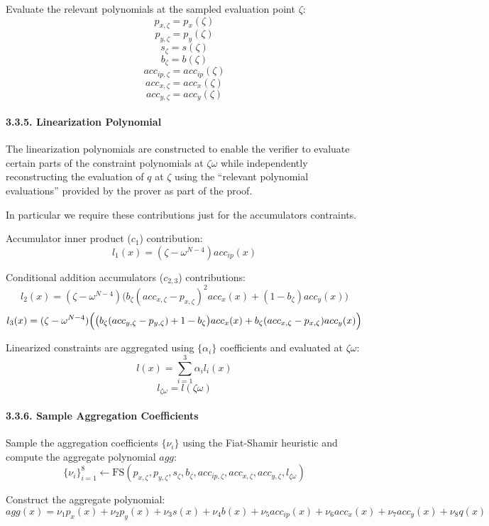 \documentclass[
]{article}
\begin{document}
Evaluate the relevant polynomials at the sampled evaluation point
\(\zeta\): \[p_{x,\zeta} = p_x(\zeta)\] \[p_{y,\zeta} = p_y(\zeta)\]
\[s_\zeta = s(\zeta)\] \[b_\zeta = b(\zeta)\]
\[acc_{ip,\zeta} = acc_{ip}(\zeta)\] \[acc_{x,\zeta} = acc_x(\zeta)\]
\[acc_{y,\zeta} = acc_y(\zeta)\]

\hypertarget{linearization-polynomial}{%
\paragraph{3.3.5. Linearization
Polynomial}\label{linearization-polynomial}}

The linearization polynomials are constructed to enable the verifier to
evaluate certain parts of the constraint polynomials at \(\zeta \omega\)
while independently reconstructing the evaluation of \(q\) at \(\zeta\)
using the ``relevant polynomial evaluations'' provided by the prover as
part of the proof.

In particular we require these contributions just for the accumulators
contraints.

Accumulator inner product (\(c_1\)) contribution:
\[l_1(x)=(\zeta - \omega^{N-4})acc_{ip}(x)\]

Conditional addition accumulators (\(c_{2,3}\)) contributions:
\[l_2(x)=(\zeta-\omega^{N-4})\bigl(b_\zeta(acc_{x,\zeta}-p_{x,\zeta})^2acc_x(x)+(1-b_\zeta)acc_y(x)\bigr)\]
\[l_3(x)=(\zeta-\omega^{N-4})\Bigl(\bigl(b_\zeta(acc_{y,\zeta}-p_{y,\zeta})+1-b_\zeta\bigr)acc_x(x)+b_\zeta(acc_{x,\zeta}-p_{x,\zeta})acc_y(x)\Bigr)\]

Linearized constraints are aggregated using \(\{\alpha_i\}\)
coefficients and evaluated at \(\zeta \omega\):
\[l(x)=\sum_{i=1}^3\alpha_i l_i(x)\] \[l_{\zeta\omega}=l(\zeta\omega)\]

\hypertarget{sample-aggregation-coefficients}{%
\paragraph{3.3.6. Sample Aggregation
Coefficients}\label{sample-aggregation-coefficients}}

Sample the aggregation coefficients \(\{\nu_i\}\) using the Fiat-Shamir
heuristic and compute the aggregate polynomial \(agg\):
\[\{\nu_i\}_{i=1}^8 \leftarrow \text{FS}(p_{x,\zeta}, p_{y,\zeta}, s_\zeta, b_\zeta, acc_{ip,\zeta}, acc_{x,\zeta}, acc_{y,\zeta}, l_{\zeta\omega})\]

Construct the aggregate polynomial:
\[agg(x)=\nu_1p_x(x)+\nu_2p_y(x)+\nu_3s(x)+\nu_4b(x)+\nu_5acc_{ip}(x)+\nu_6acc_x(x)+\nu_7acc_y(x)+\nu_8q(x)\]
\end{document}
